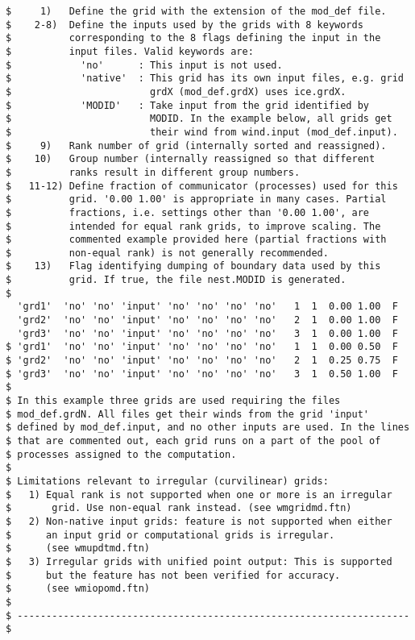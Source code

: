 \begin{footnotesize}
\begin{verbatim}
$     1)   Define the grid with the extension of the mod_def file.
$    2-8)  Define the inputs used by the grids with 8 keywords 
$          corresponding to the 8 flags defining the input in the
$          input files. Valid keywords are:
$            'no'      : This input is not used.
$            'native'  : This grid has its own input files, e.g. grid
$                        grdX (mod_def.grdX) uses ice.grdX.
$            'MODID'   : Take input from the grid identified by 
$                        MODID. In the example below, all grids get
$                        their wind from wind.input (mod_def.input).
$     9)   Rank number of grid (internally sorted and reassigned).
$    10)   Group number (internally reassigned so that different
$          ranks result in different group numbers.
$   11-12) Define fraction of communicator (processes) used for this
$          grid. '0.00 1.00' is appropriate in many cases. Partial 
$          fractions, i.e. settings other than '0.00 1.00', are 
$          intended for equal rank grids, to improve scaling. The 
$          commented example provided here (partial fractions with
$          non-equal rank) is not generally recommended.
$    13)   Flag identifying dumping of boundary data used by this
$          grid. If true, the file nest.MODID is generated.
$
  'grd1'  'no' 'no' 'input' 'no' 'no' 'no' 'no'   1  1  0.00 1.00  F
  'grd2'  'no' 'no' 'input' 'no' 'no' 'no' 'no'   2  1  0.00 1.00  F
  'grd3'  'no' 'no' 'input' 'no' 'no' 'no' 'no'   3  1  0.00 1.00  F
$ 'grd1'  'no' 'no' 'input' 'no' 'no' 'no' 'no'   1  1  0.00 0.50  F
$ 'grd2'  'no' 'no' 'input' 'no' 'no' 'no' 'no'   2  1  0.25 0.75  F
$ 'grd3'  'no' 'no' 'input' 'no' 'no' 'no' 'no'   3  1  0.50 1.00  F
$
$ In this example three grids are used requiring the files
$ mod_def.grdN. All files get their winds from the grid 'input'
$ defined by mod_def.input, and no other inputs are used. In the lines
$ that are commented out, each grid runs on a part of the pool of
$ processes assigned to the computation.
$
$ Limitations relevant to irregular (curvilinear) grids:
$   1) Equal rank is not supported when one or more is an irregular
$       grid. Use non-equal rank instead. (see wmgridmd.ftn)
$   2) Non-native input grids: feature is not supported when either 
$      an input grid or computational grids is irregular.
$      (see wmupdtmd.ftn)
$   3) Irregular grids with unified point output: This is supported
$      but the feature has not been verified for accuracy.
$      (see wmiopomd.ftn)
$
$ -------------------------------------------------------------------- $

\end{verbatim}
\end{footnotesize}
